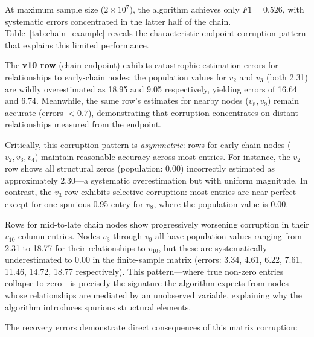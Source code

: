 \documentclass[11pt,a4paper]{article}
\numberwithin{equation}{section}
\begin{document}
At maximum sample size ($2 \times 10^7$), the algorithm achieves only $F1 = 0.526$, with systematic errors concentrated in the latter half of the chain. Table~\ref{tab:chain_example} reveals the characteristic endpoint corruption pattern that explains this limited performance.

The \textbf{v10 row} (chain endpoint) exhibits catastrophic estimation errors for relationships to early-chain nodes: the population values for $v_2$ and $v_3$ (both 2.31) are wildly overestimated as 18.95 and 9.05 respectively, yielding errors of 16.64 and 6.74. Meanwhile, the same row's estimates for nearby nodes ($v_8, v_9$) remain accurate (errors $< 0.7$), demonstrating that corruption concentrates on distant relationships measured from the endpoint.

Critically, this corruption pattern is \emph{asymmetric}: rows for early-chain nodes ($v_2, v_3, v_4$) maintain reasonable accuracy across most entries. For instance, the $v_2$ row shows all structural zeros (population: 0.00) incorrectly estimated as approximately 2.30—a systematic overestimation but with uniform magnitude. In contrast, the $v_3$ row exhibits selective corruption: most entries are near-perfect except for one spurious 0.95 entry for $v_8$, where the population value is 0.00.

Rows for mid-to-late chain nodes show progressively worsening corruption in their $v_{10}$ column entries. Nodes $v_3$ through $v_9$ all have population values ranging from 2.31 to 18.77 for their relationships to $v_{10}$, but these are systematically underestimated to 0.00 in the finite-sample matrix (errors: 3.34, 4.61, 6.22, 7.61, 11.46, 14.72, 18.77 respectively). This pattern—where true non-zero entries collapse to zero—is precisely the signature the algorithm expects from nodes whose relationships are mediated by an unobserved variable, explaining why the algorithm introduces spurious structural elements.

The recovery errors demonstrate direct consequences of this matrix corruption:
\end{document}
